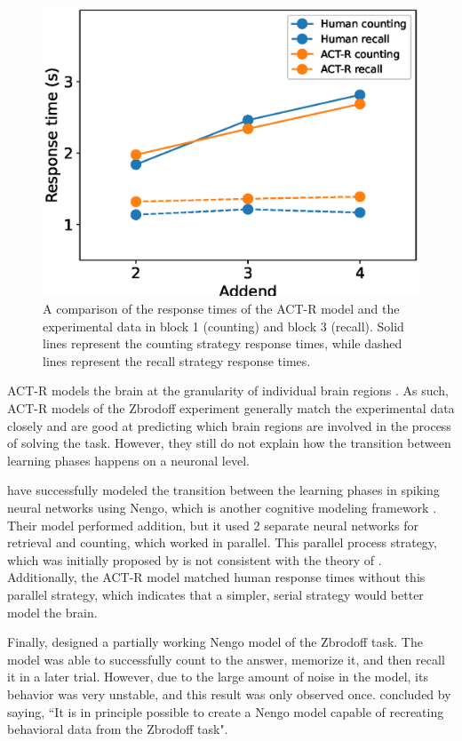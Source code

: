 \documentclass[10pt, a4paper, twocolumn]{article}
\begin{document}
\begin{figure}[h]
	\centering
	\includegraphics[width=1.0\linewidth]{figures/actr-zbrodoff.eps}
	\caption{A comparison of the response times of the ACT-R model and the experimental data in block 1 (counting) and block 3 (recall). Solid lines represent the counting strategy response times, while dashed lines represent the recall strategy response times.}
	\label{fig:actr-zbrodoff}
\end{figure}

ACT-R models the brain at the granularity of individual brain regions \citep{Anderson2004}. As such, ACT-R models of the Zbrodoff experiment generally match the experimental data closely and are good at predicting which brain regions are involved in the process of solving the task. However, they still do not explain how the transition between learning phases happens on a neuronal level.
	
\cite{Aubin2016} have successfully modeled the transition between the learning phases in spiking neural networks using Nengo, which is another cognitive modeling framework \citep{Nengo}. Their model performed addition, but it used 2 separate neural networks for retrieval and counting, which worked in parallel. This parallel process strategy, which was initially proposed by \cite{Logan1988} is not consistent with the theory of \cite{Fitts1967}. Additionally, the ACT-R model matched human response times without this parallel strategy, which indicates that a simpler, serial strategy would better model the brain.
	
Finally, \cite{Praetorius} designed a partially working Nengo model of the Zbrodoff task. The model was able to successfully count to the answer, memorize it, and then recall it in a later trial. However, due to the large amount of noise in the model, its behavior was very unstable, and this result was only observed once. \citeauthor{Praetorius} concluded by saying, ``It is in principle possible to create a Nengo model capable of recreating behavioral data from the Zbrodoff task".
	
\end{document}

